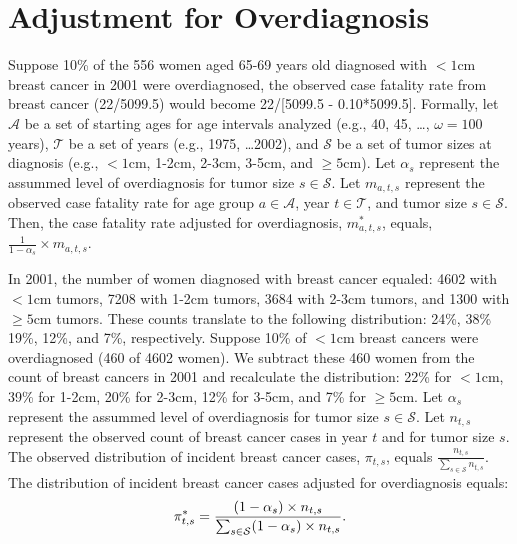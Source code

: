 \documentclass[11pt,letterpaper]{article}
\theoremstyle{plain}
\theoremstyle{remark}
\numberwithin{equation}{section}
\begin{document}
\section{Adjustment for Overdiagnosis}
Suppose 10\% of the 556 women aged 65-69 years old diagnosed with $<1$cm
breast cancer in 2001 were overdiagnosed, the observed case fatality
rate from breast cancer (22/5099.5) would become 22/[5099.5 -
0.10*5099.5].  Formally, let $\mathcal{A}$ be a set of starting ages
for age intervals analyzed (e.g., 40, 45, \dots, $\omega=100$ years), $\mathcal{T}$ be a set of
years (e.g., 1975, \dots 2002), and $\mathcal{S}$ be a set of tumor
sizes at diagnosis (e.g., $<1$cm, 1-2cm, 2-3cm, 3-5cm, and $\geq5$cm).
Let $\alpha_s$ represent the assummed level of overdiagnosis for tumor
size $s\in\mathcal{S}$.  Let $m_{a,t,s}$ represent the observed case
fatality rate for age group $a \in \mathcal{A}$, year $t \in
\mathcal{T}$, and tumor size $s \in \mathcal{S}$.  Then, the case
fatality rate adjusted for overdiagnosis, $m^*_{a,t,s}$, equals,
$\frac{1}{1-\alpha_s} \times m_{a,t,s}$.

In 2001, the number of women diagnosed with breast cancer equaled:
4602 with $<1$cm tumors, 7208 with 1-2cm tumors, 3684 with 2-3cm
tumors, and 1300 with $\geq5$cm tumors.  These counts translate to the
following distribution: 24\%, 38\% 19\%, 12\%, and 7\%, respectively.
Suppose 10\% of $<1$cm breast cancers were overdiagnosed (460 of 4602
women).  We subtract these 460 women from the count of breast cancers
in 2001 and recalculate the distribution: 22\% for $<1$cm, 39\% for
1-2cm, 20\% for 2-3cm, 12\% for 3-5cm, and 7\% for $\geq5$cm.  
Let $\alpha_s$ represent the assummed level of overdiagnosis for tumor
size $s\in\mathcal{S}$.  Let $n_{t,s}$ represent the observed count
of breast cancer cases in year $t$ and for tumor size $s$.  The
observed distribution of incident breast cancer cases, $\pi_{t,s}$, equals
$\frac{n_{t,s}}{\sum_{s\in\mathcal{S}}n_{t,s}}$.  The distribution of
incident breast cancer cases adjusted for overdiagnosis equals: 
\begin{eqnarray}
\pi^*_{t,s}=\frac{(1-\alpha_s) \times n_{t,s}}{\sum_{s\in\mathcal{S}}
  (1-\alpha_s) \times n_{t,s}} \notag.
\end{eqnarray} 
\end{document}
